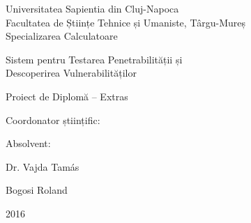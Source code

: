 
\renewcommand{\listoflistingscaption}{Lista fragmente de coduri}
\renewcommand{\listingscaption}{Fragment de cod}

\newpage
\pagestyle{empty}

	\begin{center}
		{\Large Universitatea Sapientia din Cluj-Napoca}\\\vspace{0.07in}
		{\Large Facultatea de Științe Tehnice și Umaniste, Târgu-Mureș}\\\vspace{0.07in}
		{\Large Specializarea Calculatoare}\\
		
		\vspace{2.35in}
		
		{\huge Sistem pentru Testarea Penetrabilității și}\\\vspace{0.15in}
		{\huge Descoperirea Vulnerabilităților}
		
		\vspace{0.5in}
		
		{\LARGE Proiect de Diplomă -- Extras}
		
	\end{center}
	
	\vspace{2.0in}
	
	\begin{multicols}{2}
		\begin{flushleft}
			{\Large Coordonator științific:}
		\end{flushleft}
		\columnbreak
		\begin{flushright}
			{\Large Absolvent:}
		\end{flushright}
	\end{multicols}
	\begin{multicols}{2}
		\begin{flushleft}
			{\LARGE Dr. Vajda Tamás}
		\end{flushleft}
		\columnbreak
		\begin{flushright}
			{\LARGE Bogosi Roland}
		\end{flushright}
	\end{multicols}
	
	\vspace{1.5in}
		
	\begin{center}
		{\LARGE 2016}
	\end{center}

